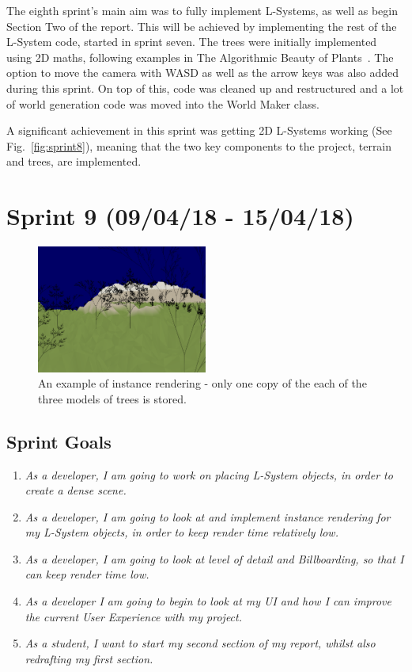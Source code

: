 \documentclass[a4paper,10pt]{report}
\begin{document}
The eighth sprint's main aim was to fully implement L-Systems, as well as begin Section Two of the report. This will be achieved by implementing the rest of the L-System code, started in sprint seven. The trees were initially implemented using 2D maths, following examples in The Algorithmic Beauty of Plants~\cite{prusinkiewicz2012algorithmic}. The option to move the camera with WASD as well as the arrow keys was also added during this sprint. On top of this, code was cleaned up and restructured and a lot of world generation code was moved into the World Maker class.

A significant achievement in this sprint was getting 2D L-Systems working (See Fig.~\ref{fig:sprint8}), meaning that the two key components to the project, terrain and trees, are implemented. 


\clearpage
\section{Sprint 9 (09/04/18 -  15/04/18)}

\begin{figure}[h!]
    \centering
  \includegraphics[width=0.5\textwidth]{Images/Sprint-Images/Sprint9-1.png}
 \caption{An example of instance rendering - only one copy of the each of the three models of trees is stored.}
 \label{fig:sprint9-1}
\end{figure}

\subsection{Sprint Goals}
\begin{enumerate}
    \item \textit{ As a developer, I am going to work on placing L-System objects, in order to create a dense scene.}

    \item \textit{ As a developer, I am going to look at and implement instance rendering for my L-System objects, in order to keep render time relatively low.}

    \item \textit{ As a developer, I am going to look at level of detail and Billboarding, so that I can keep render time low.}

    \item \textit{ As a developer I am going to begin to look at my UI and how I can improve the current User Experience with my project.}

    \item \textit{ As a student, I want to start my second section of my report, whilst also redrafting my first section. }
\end{enumerate}
\end{document}
